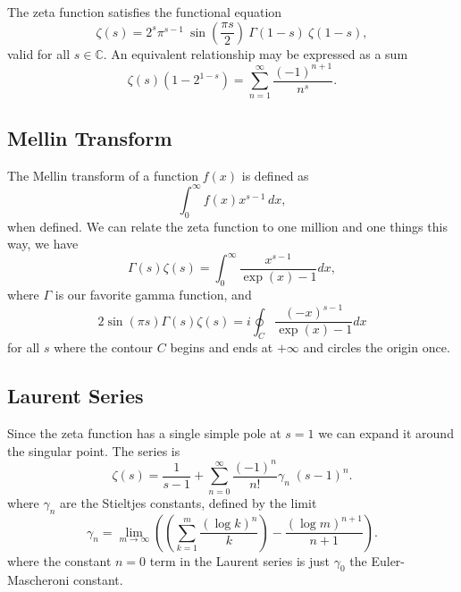 The zeta function satisfies the functional equation
\begin{equation}%
\zeta(s) = 2^s\pi^{s-1}\ \sin\left(\frac{\pi s}{2}\right)\ \Gamma(1-s)\ \zeta(1-s) \!,
\end{equation}
valid for all $s\in\mathbb{C}$. An equivalent relationship may be
expressed as a sum
\begin{equation}%
\zeta(s)(1-{2^{1-s}})= \sum_{n=1}^\infty \frac{(-1)^{n+1}}{n^s}.\!
\end{equation}


\subsection{Mellin Transform}

The Mellin transform of a function $f(x)$ is defined as
\begin{equation}%
 \int_0^\infty f(x)x^{s-1}\, dx,\!
\end{equation}
when defined. We can relate the zeta function to one million and
one things this way, we have
\begin{equation}%
\Gamma(s)\zeta(s) =\int_0^\infty\frac{x^{s-1}}{\exp(x)-1}dx,\!
\end{equation}
where $\Gamma$ is our favorite gamma function, and
\begin{equation}%
2\sin(\pi s)\Gamma(s)\zeta(s) =i\oint_{C}\frac{(-x)^{s-1}}{\exp(x)-1}dx\!
\end{equation}
for all $s$ where the contour $C$ begins and ends at $+\infty$
and circles the origin once.

\subsection{Laurent Series}

Since the zeta function has a single simple pole at $s=1$ we can
expand it around the singular point. The series is
\begin{equation}%
\zeta(s)=\frac{1}{s-1}+\sum_{n=0}^\infty \frac{(-1)^n}{n!} \gamma_n \; (s-1)^n.
\end{equation}
where $\gamma_n$ are the Stieltjes constants, defined by the
limit
\begin{equation}%
 \gamma_n = \lim_{m \rightarrow \infty} {\left(\left(\sum_{k = 1}^m \frac{(\log k)^n}{k}\right) - \frac{(\log m)^{n+1}}{n+1}\right)}.
\end{equation}
where the constant $n=0$ term in the Laurent series is just
$\gamma_0$ the Euler-Mascheroni constant.

